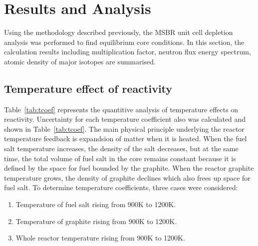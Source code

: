 \documentclass{anstrans}
\begin{document}
\section{Results and Analysis}

Using the methodology described previously, the \gls{MSBR} unit cell depletion analysis was performed to find equilibrium core conditions. In this section, the calculation results including multiplication factor, neutron flux energy spectrum, atomic density of major isotopes are summarised.

\subsection{Temperature effect of reactivity}
Table~\ref{tab:tcoef} represents the quantitive analysis of temperature effects on reactivity. Uncertainty for each temperature coefficient also was calculated and shown in Table~\ref{tab:tcoef}. The main physical principle underlying the reactor temperature feedback is expandsion of matter when it is heated. When the fuel salt temperature increases, the density of the salt decreases, but at the same time, the total volume of fuel salt in the core remains constant because it is defined by the space for fuel bounded by the graphite. When the reactor graphite temperature grows, the density of graphite declines which also frees up space for fuel salt. To determine temperature coefficients, three cases were considered:
\begin{enumerate}  
\item Temperature of fuel salt rising from 900K to 1200K.
\item Temperature of graphite rising from 900K to 1200K. 
\item Whole reactor temperature rising from 900K to 1200K.
\end{enumerate}
\end{document}
